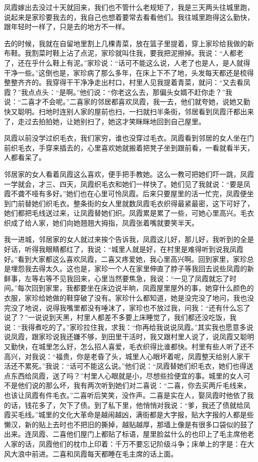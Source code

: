 \documentclass[12pt,UTF8]{ctexbook}
\begin{document}
凤霞嫁出去没过十天就回来，我们也不管什么老规矩了，我是三天两头往城里跑，说起来是家珍要我去的，我自己也想着要常去看看他们。我往城里跑得这么勤快，跟年轻时一样了，只是去的地方不一样。

去的时候，我就在自留地里割上几棵青菜，放在篮子里提着，穿上家珍给我做的新布鞋。我割菜时鞋上沾了点泥，家珍就叫住我，要我把泥擦掉。我说：“人都老了，还在乎什么鞋上有泥。”家珍说：“话可不能这么说，人老了也是人，是人就得干净一些。”这倒也是，家珍病了那么多年，在床上下不了地，头发每天都还是梳得整整齐齐的。我穿得干干净净走出村口，村里人见我提着青菜，就问：“又去看凤霞？”我点点头：“是啊。”他们说：“你老这么去，那偏头女婿不赶你走？”我说：“二喜才不会呢。”二喜家的邻居都喜欢凤霞，我一去，他们就夸她，说她又勤快又聪明。扫地时连别人家的屋前也扫，一扫就扫半条街，邻居看到凤霞汗都出来了，走过去拍拍她，让她别扫了，她这才笑眯眯地回到自己屋里。

凤霞以前没学过织毛衣，我们家穷，谁也没穿过毛衣。凤霞看到邻居的女人坐在门前织毛衣，手穿来插去的，心里喜欢她就搬着把凳子坐到跟前看，一看就看半天，人都看呆了。

邻居家的女人看着凤霞这么喜欢，便手把手教她。这么一教可把她们吓一跳，凤霞一学就会，才三、四天，凤霞织毛衣和她们一样快了。她们见了我就说：“要是凤霞不聋不哑有多好。”她们也在心里可怜凤霞。后来只要屋里的活一忙完，凤霞便坐到门前替她们织毛衣。整条街的女人里就数凤霞毛衣织得最紧最密，这下可好了，她们都把毛线送过来，让凤霞替她们织。凤霞累是累了一些，可她心里高兴。毛衣织成了给人家，她们向她翘翘大拇指，凤霞张着嘴就要笑半天。

我一进城，邻居家的女人就过来挨个告诉我，凤霞这儿好，那儿好，我听到的全是好话，听得我眼睛都红了，我说：“城里人就是好，在村里是难得听到说我凤霞好。”看到大家都这么喜欢凤霞，二喜又疼爱她，我心里高兴啊。回到家里，家珍总是埋怨我去得太久。这也是，家珍一个人在家里伸直了脖子等我回去说些凤霞的新鲜事，左等右等不见我回来，心里当然要焦急，我说：“一见了凤霞就忘了时间。”每次回到家里，我都要坐在床边说半晌，凤霞屋里屋外的事，她穿什么颜色的衣服，家珍给她做的鞋穿破了没有。家珍什么都知道，她是没完没了地问，我也没完没了地说，说得我嘴里都没有唾沫了，家珍也不放过我，问我：“还有什么忘了说了？”一说说到天黑，村里人都差不多要上床睡觉了，我们都还没吃饭，我说：“我得煮吃的了。”家珍拉住我，求我：“你再给我说说凤霞。”其实我也愿意多说说凤霞，跟家珍说我还嫌不够，到田里干活时，我又跟村里人说了，说凤霞又聪明又勤快，在城里怎么好，怎么招人喜爱，毛衣织得比谁都快。村里有些人听了还不高兴，对我说：“福贵，你是老昏了头，城里人心眼坏着呢，凤霞整天给别人家干活还不累死。”我说：“话可不能这么说。”他们说：“凤霞替她们织毛衣，她们也得送点东西给凤霞，送了吗？”村里人心眼就是小，尽想些捡便宜的事。城里的女人可不是他们说的那么坏，我有两次听到她们对二喜说：“二喜，你去买两斤毛线来，也该让凤霞有件毛衣。”二喜听后笑笑，没作声。二喜是实在人，娶凤霞时他依了我的话，钱花多了，欠下了债。到了私下里，他悄悄对我说：“爹，我还了债就给凤霞买毛线。”城里的文化大革命是越闹越凶，满街都是大字报，贴大字报的人都是些懒汉，新的贴上去时也不把旧的撕掉，越贴越厚，那墙上像是有很多口袋似的鼓了出来。连凤霞、二喜他们屋门上都贴了标语，屋里脸盆什么的也印上了毛主席他老人家的话，凤霞他们的枕巾上印着：千万不要忘记阶级斗争；床单上的字是：在大风大浪中前进。二喜和凤霞每天都睡在毛主席的话上面。
\end{document}
